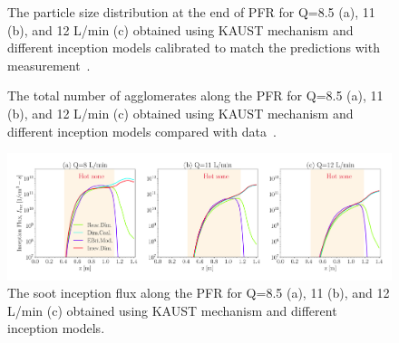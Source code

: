 \begin{figure}[H]
	\centering
	\caption{The particle size distribution at the end of PFR for Q=8.5 (a), 11 (b), and 12 L/min (c) obtained using KAUST mechanism and different inception models calibrated to match the predictions with measurement~\citep{mei2019quantitative}.}
	\label{fig:pfr_psd} 
\end{figure}

\begin{figure}[H]
	\centering
	\caption{The total number of agglomerates along the PFR for Q=8.5 (a), 11 (b), and 12 L/min (c) obtained using KAUST mechanism and different inception models compared with data~\citep{mei2019quantitative}.}
	\label{fig:pfr_Nagg} 
\end{figure}

\begin{figure}[H]
	\centering
	\includegraphics[width=1\textwidth]{Figures/Results/PFR/inception.pdf}
	\caption{The soot inception flux along the PFR for Q=8.5 (a), 11 (b), and 12 L/min (c) obtained using KAUST mechanism and different inception models.}
	\label{fig:pfr_Iinc} 
\end{figure}